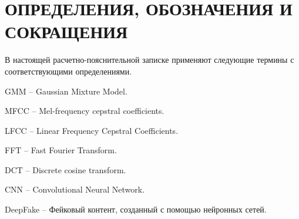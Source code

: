 \part*{ОПРЕДЕЛЕНИЯ, ОБОЗНАЧЕНИЯ И\\СОКРАЩЕНИЯ}
В настоящей расчетно-пояснительной записке применяют следующие термины с соответствующими определениями.

\begin{enumdescript}
        \item[GMM] -- Gaussian Mixture Model.
        \item[MFCC] -- Mel-frequency cepstral coefficients.
        \item[LFCC] -- Linear Frequency Cepstral Coefficients.
        \item[FFT] -- Fast Fourier Transform.
        \item[DCT] -- Discrete cosine transform.
	\item[CNN] -- Convolutional Neural Network.
        \item[DeepFake] -- Фейковый контент, созданный с помощью нейронных сетей.
\end{enumdescript}
